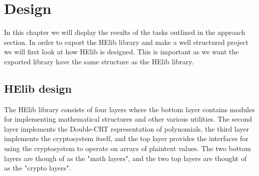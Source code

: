 

\afterpage{\blankpage}   %

\chapter{Design}
In this chapter we will display the results of the tasks outlined in the approach section. In order to export the HElib library and make a well structured project we will first look at how HElib is designed. This is important as we want the exported library have the same structure as the HElib library.

\section{HElib design}
The HElib library consists of four layers where the bottom layer contains modules for implementing mathematical structures and other various utilities\cite{halevi2013design}. The second layer implements the Double-CRT representation of polynomials, the third layer implements the cryptosystem itself, and the top layer provides the interfaces for using the cryptosystem to operate on arrays of plaintext values. The two bottom layers are though of as the "math layers", and the two top layers are thought of as the "crypto layers". 
